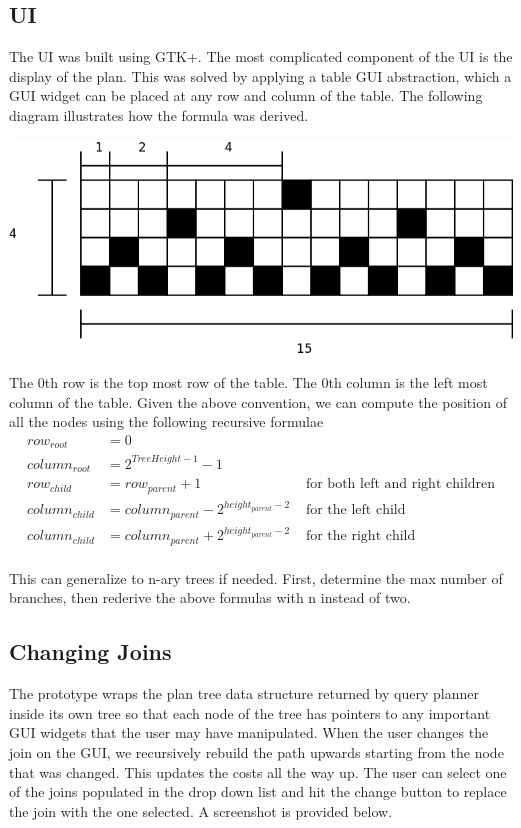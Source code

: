 \documentclass[letterpaper,10pt]{article}
\begin{document}
\subsection{UI}
The UI was built using GTK+. The most complicated component of the UI is the
display of the plan. This was solved by applying a table GUI abstraction, which a
GUI widget can be placed at any row and column of the table. The following
diagram illustrates how the formula was derived.

\includegraphics[scale=0.5]{table-derivation.png}

The 0th row is the top most row of the table. The 0th column is the left most
column of the table. Given the above convention, we can compute the position of
all the nodes using the following recursive formulae \\
\begin{align*}
	row_{root} & = 0 \\
	column_{root} & = 2^{TreeHeight-1}-1 \\
	row_{child} & = row_{parent} + 1 & \mbox { for both left and right children}\\
	column_{child} & = column_{parent} - 2^{height_{parent}-2} & \mbox { for the left child} \\
	column_{child} & = column_{parent} + 2^{height_{parent}-2} & \mbox { for the right child} \\
\end{align*}

This can generalize to n-ary trees if needed. First, determine the max number of
branches, then rederive the above formulas with n instead of two.

\subsection{Changing Joins}
The prototype wraps the plan tree data structure returned by query planner inside
its own tree so that each node of the tree has pointers to any important GUI
widgets that the user may have manipulated. When the user changes the join on
the GUI, we recursively rebuild the path upwards starting from the node that was
changed. This updates the costs all the way up. The user can select one of the
joins populated in the drop down list and hit the change button to replace the
join with the one selected. A screenshot
is provided below.
\end{document}
